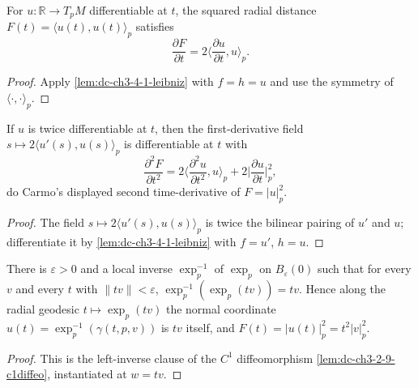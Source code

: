 \begin{lemma}
  \label{lem:dc-ch3-4-1-dF}
  \leanok
  For $u:\mathbb{R}\to T_pM$ differentiable at $t$, the squared radial distance
  $F(t)=\langle u(t),u(t)\rangle_p$ satisfies
  $$\frac{\partial F}{\partial t}=2\Big\langle\frac{\partial u}{\partial t},u\Big\rangle_p.$$
\end{lemma}
\begin{proof}
  \leanok
  Apply \cref{lem:dc-ch3-4-1-leibniz} with $f=h=u$ and use the symmetry of
  $\langle\cdot,\cdot\rangle_p$.
\end{proof}

\begin{lemma}
  \label{lem:dc-ch3-4-1-ddF}
  \leanok
  If $u$ is twice differentiable at $t$, then the first-derivative field
  $s\mapsto 2\langle u'(s),u(s)\rangle_p$ is differentiable at $t$ with
  $$\frac{\partial^2 F}{\partial t^2}
    = 2\Big\langle\frac{\partial^2 u}{\partial t^2},u\Big\rangle_p
      + 2\Big|\frac{\partial u}{\partial t}\Big|_p^2,$$
  do Carmo's displayed second time-derivative of $F=|u|_p^2$.
\end{lemma}
\begin{proof}
  \leanok
  The field $s\mapsto 2\langle u'(s),u(s)\rangle_p$ is twice the bilinear pairing
  of $u'$ and $u$; differentiate it by \cref{lem:dc-ch3-4-1-leibniz} with
  $f=u'$, $h=u$.
\end{proof}

\begin{lemma}
  \label{lem:dc-ch3-4-1-radialcoord}
  \leanok
  There is $\varepsilon>0$ and a local inverse $\exp_p^{-1}$ of $\exp_p$ on
  $B_\varepsilon(0)$ such that for every $v$ and every $t$ with
  $\|tv\|<\varepsilon$, $\exp_p^{-1}(\exp_p(tv))=tv$. Hence along the radial
  geodesic $t\mapsto\exp_p(tv)$ the normal coordinate $u(t)=\exp_p^{-1}(\gamma(t,p,v))$
  is $tv$ itself, and $F(t)=|u(t)|_p^2=t^2|v|_p^2$.
\end{lemma}
\begin{proof}
  \leanok
  This is the left-inverse clause of the $C^1$ diffeomorphism
  \cref{lem:dc-ch3-2-9-c1diffeo}, instantiated at $w=tv$.
\end{proof}

